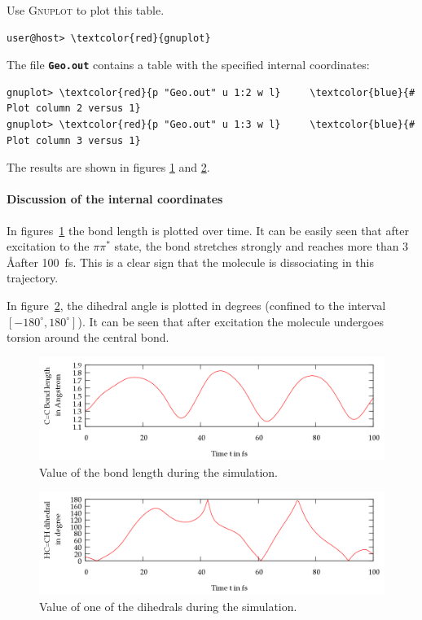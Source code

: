\documentclass[a4paper,11pt,DIV=15,openany]{scrbook}
\newcommand{\ttt}[1]{\textbf{\texttt{#1}}}
\begin{document}
Use \textsc{Gnuplot} to plot this table. 
\begin{Verbatim}[commandchars=\\\{\}]
user@host> \textcolor{red}{gnuplot}
\end{Verbatim}
The file \ttt{Geo.out} contains a table with the specified internal coordinates:
\begin{oframed}
\footnotesize\begin{Verbatim}[commandchars=\\\{\}]
gnuplot> \textcolor{red}{p "Geo.out" u 1:2 w l}     \textcolor{blue}{# Plot column 2 versus 1}
gnuplot> \textcolor{red}{p "Geo.out" u 1:3 w l}     \textcolor{blue}{# Plot column 3 versus 1}
\end{Verbatim}
\end{oframed}

\normalsize
The results are shown in figures \ref{fig:cc} and \ref{fig:dih}.

\paragraph{Discussion of the internal coordinates} 

In figures~\ref{fig:cc} the  bond length is plotted over time. It can be easily seen that after excitation to the $\pi\pi^*$ state, the  bond stretches strongly and reaches more than 3\,\AA after 100~fs.
This is a clear sign that the  molecule is dissociating in this trajectory.

In figure~\ref{fig:dih}, the dihedral angle  is plotted in degrees (confined to the interval $[-180^\circ,180^\circ]$). 
It can be seen that after excitation the molecule undergoes torsion around the central bond.

\begin{figure}[htb]
  \centering
  \includegraphics[width=\textwidth]{figures/CC.png}
  \caption{Value of the  bond length during the simulation.}
  \label{fig:cc}
\end{figure}
\begin{figure}[htb]
  \centering
  \includegraphics[width=\textwidth]{figures/dih.png}
  \caption{Value of one of the  dihedrals during the simulation.}
  \label{fig:dih}
\end{figure}
\end{document}

